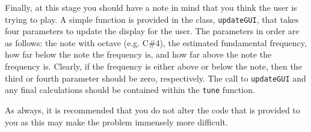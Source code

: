 Finally, at this stage you should have a note in mind that you think the user is trying to play.
A simple function is provided in the class, \verb=updateGUI=, that takes four parameters to update the display for the user.
The parameters in order are as follows: the note with octave (e.g. C\#4),  the estimated fundamental frequency, how far below the note the frequency is, and how far above the note the frequency is.
Clearly, if the frequency is either above or below the note, then the third or fourth parameter should be zero, respectively.
The call to \verb=updateGUI= and any final calculations should be contained within the \verb=tune= function.

As always, it is recommended that you do not alter the code that is provided to you as this may make the problem immensely more difficult.

